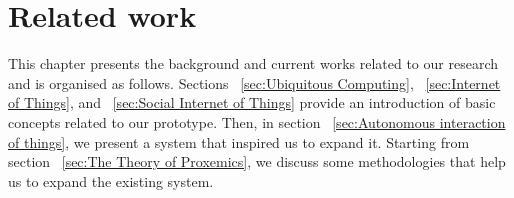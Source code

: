


\lstset{language=Java, basicstyle=\footnotesize}

\renewcommand{\thepage}{\roman{page}}
\newcommand{\monthword}[1]{\ifcase#1\or January\or February\or March\or April\or
                                        May\or June\or July\or August\or
                                        September\or October\or November\or December\fi} 





\clearpage

\begingroup
  \pagestyle{plain}

\setcounter{tocdepth}{2}
  \tableofcontents
  \clearpage
\endgroup 

\pagestyle{fancy}
\setcounter{page}{1}
\renewcommand{\thepage}{\arabic{page}}

\section{Related work}
This chapter presents the background and current works related to our research and is organised as follows. Sections ~\ref{sec:Ubiquitous Computing}, ~\ref{sec:Internet of Things}, and ~\ref{sec:Social Internet of Things} provide an introduction of basic concepts related to our prototype. Then, in section ~\ref{sec:Autonomous interaction of things}, we present a system that inspired us to expand it. Starting from section ~\ref{sec:The Theory of Proxemics}, we discuss some methodologies that help us to expand the existing system. 

